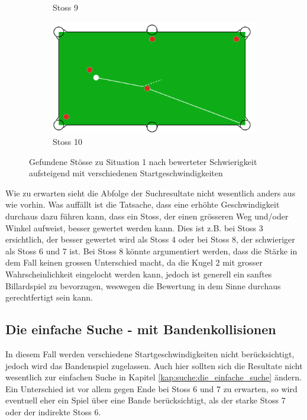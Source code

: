 \begin{figure}[h!]
\begin{subfigure}[b]{0.3\textwidth}
        \caption{Stoss 9}
        \label{fig:situation_velocity_1_solution_9}
    \end{subfigure}
    \hfill
    \begin{subfigure}[b]{0.3\textwidth}
        \centering
        \includegraphics[width=1.0\linewidth]{../common/04_results/resources/simple_search/situation_diverse_solution_velocity_10.PNG}
        \caption{Stoss 10}
        \label{fig:situation_velocity_1_solution_10}
    \end{subfigure}
    \caption{Gefundene Stösse zu Situation 1 nach bewerteter Schwierigkeit aufsteigend mit verschiedenen Startgeschwindigkeiten}
    \label{fig:situation_1_solutions_startgeschwindigkeit}
\end{figure}

Wie zu erwarten sieht die Abfolge der Suchresultate nicht wesentlich anders aus wie vorhin. Was auffällt ist die Tatsache,
dass eine erhöhte Geschwindigkeit durchaus dazu führen kann, dass ein Stoss, der einen grösseren Weg und/oder Winkel aufweist,
besser gewertet werden kann. Dies ist z.B. bei Stoss 3 ersichtlich, der besser gewertet wird als Stoss 4 oder bei
Stoss 8, der schwieriger als Stoss 6 und 7 ist. Bei Stoss 8 könnte argumentiert werden, dass die Stärke
in dem Fall keinen grossen Unterschied macht, da die Kugel 2 mit grosser Wahrscheinlichkeit eingelocht werden kann,
jedoch ist generell ein sanftes Billardspiel zu bevorzugen, weswegen die Bewertung in dem Sinne durchaus gerechtfertigt
sein kann.

\newpage

\subsection{Die einfache Suche - mit Bandenkollisionen}
In diesem Fall werden verschiedene Startgeschwindigkeiten nicht berücksichtigt, jedoch wird das Bandenspiel zugelassen.
Auch hier sollten sich die Resultate nicht wesentlich zur einfachen Suche in Kapitel \ref{kap:suche:die_einfache_suche} ändern.
Ein Unterschied ist vor allem gegen Ende bei Stoss 6 und 7 zu erwarten, so wird eventuell eher ein Spiel über eine Bande berücksichtigt,
als der starke Stoss 7 oder der indirekte Stoss 6.

